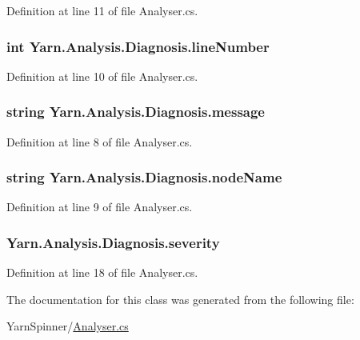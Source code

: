 Definition at line 11 of file Analyser.\-cs.

\hypertarget{a00085_a0bd73f1c684bfd66ae7b6bef8f2972d0}{
\subsubsection[{line\-Number}]{\setlength{\rightskip}{0pt plus 5cm}int Yarn.\-Analysis.\-Diagnosis.\-line\-Number}}\label{a00085_a0bd73f1c684bfd66ae7b6bef8f2972d0}


Definition at line 10 of file Analyser.\-cs.

\hypertarget{a00085_ac7ed070dddd2613c08e7874ea5afb3af}{
\subsubsection[{message}]{\setlength{\rightskip}{0pt plus 5cm}string Yarn.\-Analysis.\-Diagnosis.\-message}}\label{a00085_ac7ed070dddd2613c08e7874ea5afb3af}


Definition at line 8 of file Analyser.\-cs.

\hypertarget{a00085_a662aca4ad2af5116c2cf6773daf1a847}{
\subsubsection[{node\-Name}]{\setlength{\rightskip}{0pt plus 5cm}string Yarn.\-Analysis.\-Diagnosis.\-node\-Name}}\label{a00085_a662aca4ad2af5116c2cf6773daf1a847}


Definition at line 9 of file Analyser.\-cs.

\hypertarget{a00085_ad90ffa839ce0f568a099bb37b4a6c4da}{
\subsubsection[{severity}]{ Yarn.\-Analysis.\-Diagnosis.\-severity}}\label{a00085_ad90ffa839ce0f568a099bb37b4a6c4da}


Definition at line 18 of file Analyser.\-cs.



The documentation for this class was generated from the following file\-:\begin{DoxyCompactItemize}
\item 
Yarn\-Spinner/\hyperlink{a00293}{Analyser.\-cs}\end{DoxyCompactItemize}
